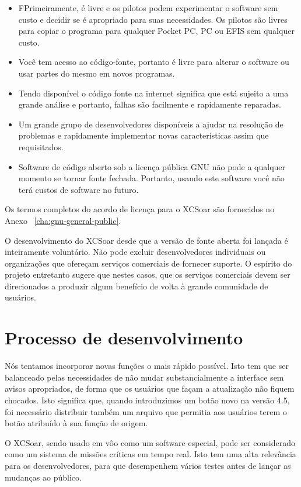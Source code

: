 \begin{itemize}
\item FPrimeiramente, é livre e os pilotos podem experimentar o software sem custo e decidir se é apropriado para suas necessidades.  Os pilotos são livres para copiar o programa para qualquer Pocket PC, PC ou EFIS sem qualquer custo.
\item Você tem acesso ao código-fonte, portanto é livre para alterar o software ou usar partes do mesmo em novos programas.
\item Tendo disponível o código fonte na internet significa que está sujeito a uma grande análise e portanto, falhas são facilmente e rapidamente reparadas.
\item Um grande grupo de desenvolvedores disponíveis a ajudar na resolução de problemas e rapidamente implementar novas características assim que requisitados.
\item Software de código aberto sob a licença pública GNU não pode a qualquer momento se tornar fonte fechada.  Portanto, usando este software você não terá custos de software no futuro.
\end{itemize}

Os termos completos do acordo de licença para o XCSoar são fornecidos no Anexo ~\ref{cha:gnu-general-public}.

O desenvolvimento do XCSoar desde que a versão de fonte aberta foi lançada é inteiramente voluntário.  Não pode excluir desenvolvedores individuais ou organizações que ofereçam serviços comerciais de fornecer suporte.  O espírito do projeto entretanto sugere que nestes casos, que os serviços comerciais devem ser direcionados a produzir algum benefício de volta à grande comunidade de usuários.


\section{Processo de desenvolvimento}

Nós tentamos incorporar novas funções o mais rápido possível.  Isto tem que ser balanceado pelas necessidades de não mudar substancialmente a interface sem avisos apropriados, de forma que os usuários que façam a atualização não fiquem chocados.  Isto significa que, quando introduzimos um botão novo na versão 4.5, foi necessário distribuir também um arquivo que permitia aos usuários terem o botão atribuído à sua função de origem.

O XCSoar, sendo usado em vôo como um software especial, pode ser considerado como um sistema de missões críticas em tempo real.  Isto tem uma alta relevância para os desenvolvedores, para que desempenhem vários testes antes de lançar as mudanças ao público.

